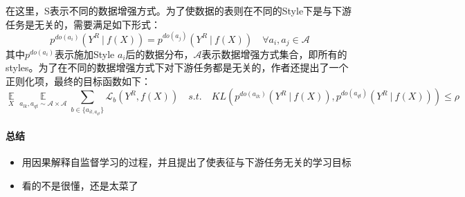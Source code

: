 在这里，S表示不同的数据增强方式。为了使数据的表则在不同的Style下是与下游任务是无关的，需要满足如下形式：
$$
p^{do(a_i)}(Y^R \:|\: f(X)) = p^{do(a_j)}(Y^R \:|\: f(X))\quad \forall a_i, a_j \in \mathcal{A}
$$
其中$p^{do(a_i)}$表示施加Style $a_i$后的数据分布，$\mathcal{A}$表示数据增强方式集合，即所有的styles。为了在不同的数据增强方式下对下游任务都是无关的，作者还提出了一个正则化项，最终的目标函数如下：
$$
\mathop{\mathbb{E}}\limits_{X} \mathop{\mathbb{E}}\limits_{a_{lk},a_{qt} \sim \mathcal{A} \times \mathcal{A}} \sum_{b \in\{a_{il,a_{qt}}\}} \mathcal{L}_b (Y^R, f(X))\quad s.t.\quad KL(p^{do(a_{lk})}(Y^R \:|\: f(X)), p^{do(a_{qt})}(Y^R \:|\: f(X))) \leq \rho
$$


\paragraph{总结}

\begin{itemize}

	\item 用因果解释自监督学习的过程，并且提出了使表征与下游任务无关的学习目标
	\item 看的不是很懂，还是太菜了

\end{itemize}

